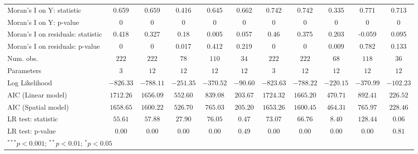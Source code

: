 \begin{table}
\begin{center}
\begin{tabular}{l c c c c c c c c c c}
Moran's I on Y: statistic         & 0.659         & 0.659         & 0.416         & 0.645        & 0.662         & 0.742         & 0.742         & 0.335         & 0.771        & 0.713         \\
Moran's I on Y: p-value           & 0             & 0             & 0             & 0            & 0             & 0             & 0             & 0             & 0            & 0             \\
Moran's I on residuals: statistic & 0.418         & 0.327         & 0.18          & 0.005        & 0.057         & 0.46          & 0.375         & 0.203         & -0.059       & 0.095         \\
Moran's I on residuals: p-value   & 0             & 0             & 0.017         & 0.412        & 0.219         & 0             & 0             & 0.009         & 0.782        & 0.133         \\
Num. obs.                         & $222$         & $222$         & $78$          & $110$        & $34$          & $222$         & $222$         & $68$          & $118$        & $36$          \\
Parameters                        & $3$           & $12$          & $12$          & $12$         & $12$          & $3$           & $12$          & $12$          & $12$         & $12$          \\
Log Likelihood                    & $-826.33$     & $-788.11$     & $-251.35$     & $-370.52$    & $-90.60$      & $-823.63$     & $-788.22$     & $-220.15$     & $-370.99$    & $-102.23$     \\
AIC (Linear model)                & $1712.26$     & $1656.09$     & $552.60$      & $839.08$     & $203.67$      & $1724.32$     & $1665.20$     & $470.71$      & $892.41$     & $226.52$      \\
AIC (Spatial model)               & $1658.65$     & $1600.22$     & $526.70$      & $765.03$     & $205.20$      & $1653.26$     & $1600.45$     & $464.31$      & $765.97$     & $228.46$      \\
LR test: statistic                & $55.61$       & $57.88$       & $27.90$       & $76.05$      & $0.47$        & $73.07$       & $66.76$       & $8.40$        & $128.44$     & $0.06$        \\
LR test: p-value                  & $0.00$        & $0.00$        & $0.00$        & $0.00$       & $0.49$        & $0.00$        & $0.00$        & $0.00$        & $0.00$       & $0.81$        \\
\hline
\multicolumn{11}{l}{\scriptsize{$^{***}p<0.001$; $^{**}p<0.01$; $^{*}p<0.05$}}
\end{tabular}
\label{Tab:SCSAR_Estimates_G3_Phi025}
\end{center}
\end{table}
